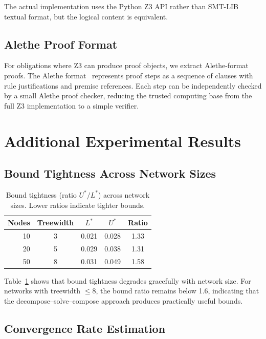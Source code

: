 \documentclass[11pt,a4paper]{article}
\begin{document}
The actual implementation uses the Python Z3 API rather than SMT-LIB textual format, but the logical content is equivalent.

\subsection{Alethe Proof Format}

For obligations where Z3 can produce proof objects, we extract Alethe-format proofs. The Alethe format~\citep{schurr2021alethe} represents proof steps as a sequence of clauses with rule justifications and premise references. Each step can be independently checked by a small Alethe proof checker, reducing the trusted computing base from the full Z3 implementation to a simple verifier.

\section{Additional Experimental Results}
\label{app:experiments}

\subsection{Bound Tightness Across Network Sizes}

\begin{table}[t]
\centering
\caption{Bound tightness (ratio $U^*/L^*$) across network sizes. Lower ratios indicate tighter bounds.}
\label{tab:tightness}
\begin{tabular}{@{}rcccc@{}}
\toprule
\textbf{Nodes} & \textbf{Treewidth} & $L^*$ & $U^*$ & \textbf{Ratio} \\
\midrule
10  & 3  & 0.021 & 0.028 & 1.33 \\
20  & 5  & 0.029 & 0.038 & 1.31 \\
50  & 8  & 0.031 & 0.049 & 1.58 \\
\bottomrule
\end{tabular}
\end{table}

Table~\ref{tab:tightness} shows that bound tightness degrades gracefully with network size. For networks with treewidth $\leq 8$, the bound ratio remains below 1.6, indicating that the decompose--solve--compose approach produces practically useful bounds.

\subsection{Convergence Rate Estimation}
\end{document}
